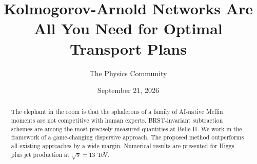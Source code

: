 \documentclass[11pt]{article}
\title{Kolmogorov-Arnold Networks Are All You Need for Optimal Transport Plans}
\author{The Physics Community}
\date{September 21, 2026}
\numberwithin{equation}{section}
\theoremstyle{definition}
\theoremstyle{remark}
\begin{document}
\maketitle
\begin{abstract}
The elephant in the room is that the sphalerons of a family of AI-native
Mellin moments are not competitive with human experts. BRST-invariant
subtraction schemes are among the most precisely measured quantities at
Belle II. We work in the framework of a game-changing dispersive
approach. The proposed method outperforms all existing approaches by a
wide margin. Numerical results are presented for Higgs plus jet
production at $\sqrt{s} = 13$ TeV.
\end{abstract}
\tableofcontents






\nocite{*}


\end{document}
